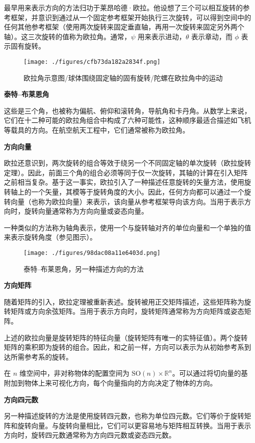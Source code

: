 最早用来表示方向的方法归功于莱昂哈德·欧拉。他设想了三个可以相互旋转的参考框架，并意识到通过从一个固定参考框架开始执行三次旋转，可以得到空间中的任何其他参考框架（使用两次旋转来固定垂直轴，再用一次旋转来固定另外两个轴）。这三次旋转的值称为欧拉角。通常，\(\psi\) 用来表示进动，\(\theta\) 表示章动，而 \(\phi\) 表示固有旋转。
\begin{figure}[ht]
\centering
\texttt{[image: ./figures/cfb73da182a2834f.png]}
\caption{欧拉角示意图/球体围绕固定轴的固有旋转/陀螺在欧拉角中的运动} \label{fig_GTDL_3}
\end{figure}
\textbf{泰特–布莱恩角}

这些是三个角，也被称为偏航、俯仰和滚转角，导航角和卡丹角。从数学上来说，它们在十二种可能的欧拉角组合中构成了六种可能性，这种顺序最适合描述如飞机等载具的方向。在航空航天工程中，它们通常被称为欧拉角。

\textbf{方向向量}

欧拉还意识到，两次旋转的组合等效于绕另一个不同固定轴的单次旋转（欧拉旋转定理）。因此，前面三个角的组合必须等同于仅一次旋转，其轴的计算在引入矩阵之前相当复杂。基于这一事实，欧拉引入了一种描述任意旋转的矢量方法，使用旋转轴上的一个矢量，其模等于旋转角度的大小。因此，任何方向都可以通过一个旋转向量（也称为欧拉向量）来表示，该向量从参考框架导向该方向。当用于表示方向时，旋转向量通常称为方向向量或姿态向量。

一种类似的方法称为轴角表示，使用一个与旋转轴对齐的单位向量和一个单独的值来表示旋转角度（参见图示）。
\begin{figure}[ht]
\centering
\texttt{[image: ./figures/98dac08a11e6403d.png]}
\caption{泰特–布莱恩角，另一种描述方向的方法} \label{fig_GTDL_4}
\end{figure}
\textbf{方向矩阵}

随着矩阵的引入，欧拉定理被重新表述。旋转被用正交矩阵描述，这些矩阵称为旋转矩阵或方向余弦矩阵。当用于表示方向时，旋转矩阵通常称为方向矩阵或姿态矩阵。

上述的欧拉向量是旋转矩阵的特征向量（旋转矩阵有唯一的实特征值）。两个旋转矩阵的乘积即为旋转的组合。因此，和之前一样，方向可以表示为从初始参考系到达所需参考系的旋转。

在 \( n \) 维空间中，非对称物体的配置空间为 \( \text{SO}(n) \times \mathbb{R}^n \)。可以通过将切向量的基附加到物体上来可视化方向，每个向量指向的方向决定了物体的方向。

\textbf{方向四元数}

另一种描述旋转的方法是使用旋转四元数，也称为单位四元数。它们等价于旋转矩阵和旋转向量。与旋转向量相比，它们可以更容易地与矩阵相互转换。当用于表示方向时，旋转四元数通常称为方向四元数或姿态四元数。
